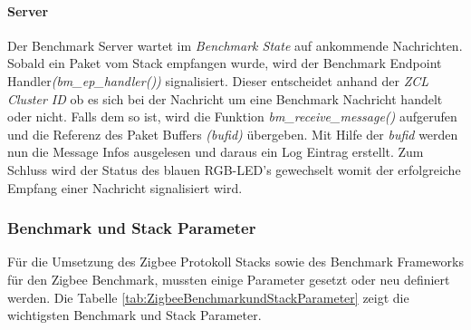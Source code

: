 \paragraph{Server}
Der Benchmark Server wartet im \textit{Benchmark State} auf ankommende Nachrichten.
Sobald ein Paket vom Stack empfangen wurde, wird der Benchmark Endpoint Handler\linebreak \textit{(bm\_ep\_handler())} signalisiert.
Dieser entscheidet anhand der \textit{ZCL Cluster ID} ob es sich bei der Nachricht um eine Benchmark Nachricht handelt oder nicht.
Falls dem so ist, wird die Funktion \textit{bm\_receive\_message()} aufgerufen und die Referenz des Paket Buffers \textit{(bufid)} übergeben.
Mit Hilfe der \textit{bufid} werden nun die Message Infos ausgelesen und daraus ein Log Eintrag erstellt.
Zum Schluss wird der Status des blauen RGB-LED's gewechselt womit der erfolgreiche Empfang einer Nachricht signalisiert wird.




\subsubsection{Benchmark und Stack Parameter}\label{subsubsec:BenchmarkundStackParameter}
Für die Umsetzung des Zigbee Protokoll Stacks sowie des Benchmark Frameworks für den Zigbee Benchmark, mussten einige Parameter gesetzt oder neu definiert werden.
Die Tabelle \ref{tab:ZigbeeBenchmarkundStackParameter} zeigt die wichtigsten Benchmark und Stack Parameter.

